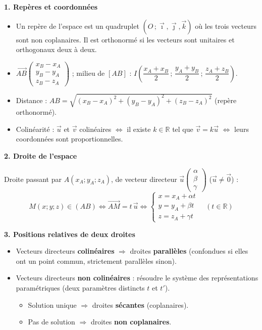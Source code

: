\documentclass[11pt]{article}
\newcommand{\cle}[1]{{\popxbold\color{popdark}#1}}
\begin{document}
\begin{bilan}
\textbf{1. Repères et coordonnées}
\begin{itemize}
  \item Un \cle{repère} de l'espace est un quadruplet $(O\,;\vec{\imath},\vec{\jmath},\vec{k})$ où les trois vecteurs sont \cle{non coplanaires}. Il est \cle{orthonormé} si les vecteurs sont unitaires et orthogonaux deux à deux.
  \item $\overrightarrow{AB}\begin{pmatrix} x_B-x_A \\ y_B-y_A \\ z_B-z_A \end{pmatrix}$ ; milieu de $[AB]$ : $I\left(\dfrac{x_A+x_B}{2}\,;\,\dfrac{y_A+y_B}{2}\,;\,\dfrac{z_A+z_B}{2}\right)$.
  \item Distance : $AB=\sqrt{(x_B-x_A)^2+(y_B-y_A)^2+(z_B-z_A)^2}$ (repère orthonormé).
  \item Colinéarité : $\vec{u}$ et $\vec{v}$ colinéaires $\iff$ il existe $k\in\mathbb{R}$ tel que $\vec{v}=k\vec{u}$ $\iff$ leurs coordonnées sont proportionnelles.
\end{itemize}

\textbf{2. Droite de l'espace}

Droite passant par $A(x_A;y_A;z_A)$, de vecteur directeur $\vec{u}\begin{pmatrix} \alpha \\ \beta \\ \gamma \end{pmatrix}$ ($\vec{u}\neq\vec{0}$) :
\[ M(x;y;z)\in(AB) \iff \overrightarrow{AM}=t\,\vec{u} \iff \begin{cases} x=x_A+\alpha t \\ y=y_A+\beta t \\ z=z_A+\gamma t \end{cases} \quad (t\in\mathbb{R}) \]

\textbf{3. Positions relatives de deux droites}
\begin{itemize}
  \item Vecteurs directeurs \textbf{colinéaires} $\Rightarrow$ droites \textbf{parallèles} (confondues si elles ont un point commun, strictement parallèles sinon).
  \item Vecteurs directeurs \textbf{non colinéaires} : résoudre le système des représentations paramétriques (deux paramètres distincts $t$ et $t'$).
  \begin{itemize}
    \item Solution unique $\Rightarrow$ droites \textbf{sécantes} (coplanaires).
    \item Pas de solution $\Rightarrow$ droites \textbf{non coplanaires}.
  \end{itemize}
\end{itemize}


\end{bilan}
\end{document}

